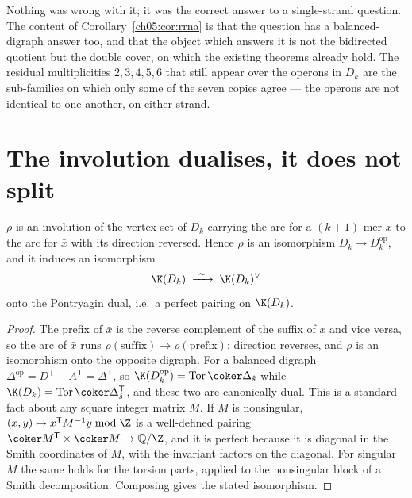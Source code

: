 \begin{remark}\label{ch05:rem:52}
Nothing was wrong with it; it was the correct answer to a single-strand question. The
content of Corollary~\ref{ch05:cor:rrna} is that the question has a balanced-digraph answer
too, and that the object which answers it is not the bidirected quotient but the double
cover, on which the existing theorems already hold. The residual multiplicities
$2,3,4,5,6$ that still appear over the operons in $D_k$ are the sub-families on which only
some of the seven copies agree --- the operons are not identical to one another, on either
strand.
\end{remark}

\section{The involution dualises, it does not split}\label{ch05:sec:rho}

\begin{proposition}\label{ch05:prop:rho}
$\rho$ is an involution of the vertex set of $D_k$ carrying the arc for a $(k{+}1)$-mer
$x$ to the arc for $\bar x$ with its direction reversed. Hence $\rho$ is an isomorphism
$D_k\to D_k^{\mathrm{op}}$, and it induces an isomorphism
\[
\K(D_k)\;\xrightarrow{\ \sim\ }\;\K(D_k)^{\vee}
\]
onto the Pontryagin dual, i.e.\ a perfect pairing on $\K(D_k)$.
\end{proposition}

\begin{proof}
The prefix of $\bar x$ is the reverse complement of the suffix of $x$ and vice versa, so
the arc of $\bar x$ runs $\rho(\text{suffix})\to\rho(\text{prefix})$: direction reverses,
and $\rho$ is an isomorphism onto the opposite digraph. For a balanced digraph
$\Delta^{\mathrm{op}}=D^{+}-A^{\mathsf T}=\Delta^{\mathsf T}$, so
$\K(D_k^{\mathrm{op}})=\operatorname{Tor}\coker\Delta_{\hat s}$ while
$\K(D_k)=\operatorname{Tor}\coker\Delta_{\hat s}^{\mathsf T}$, and these two are
canonically dual. This is a standard fact about any square integer matrix $M$. If $M$ is nonsingular,
$(x,y)\mapsto x^{\mathsf T}M^{-1}y \bmod \Z$ is a well-defined pairing
$\coker M^{\mathsf T}\times\coker M\to\mathbb Q/\Z$, and it is perfect because it is diagonal in the
Smith coordinates of $M$, with the invariant factors on the diagonal. For singular $M$ the same holds
for the torsion parts, applied to the nonsingular block of a Smith decomposition. Composing gives the
stated isomorphism.
\end{proof}


